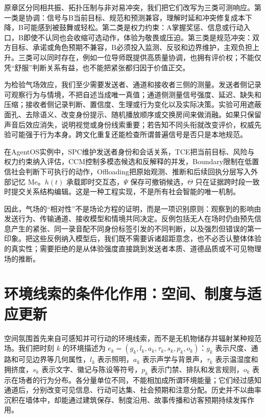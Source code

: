 原章区分同相共振、拓扑压制与非对易冲突，我们把它们改写为三类可测响应。第一类是协调：信号与B当前目标、规范和预测兼容，理解时延和冲突修复成本下降，B可能感到被鼓舞或轻松。第二类是权力约束：A掌握奖惩、信息或行动入口，B即使不认同也会收缩可选动作，体验为敬畏或压迫。第三类是规范冲突：双方目标、承诺或角色预期不兼容，B必须投入监测、反驳和边界维护，主观负担上升。三类可以同时存在，例如一位导师既提供高质量协调，也拥有评价权；不能仅凭“舒服”判断关系有益，也不能把紧张都归因于价值正交。

为检验气场效应，我们至少需要发送者、通道和接收者三侧的测量。发送者侧记录可观察行为与情境，不把自述当成唯一真值；通道侧测量信号强度、延迟、缺失和压缩；接收者侧记录判断、置信度、生理或行为变化以及实际决策。实验可用遮蔽面孔、去除语义、改变身份提示、随机播放顺序或交换房间来做消融。如果只保留声音后效应消失，说明视觉或身份线索重要；若告知不同头衔就改变评价，权威先验可能强于行为本身。跨文化重复还能检查所谓普遍信号是否只是本地规范。

在AgentOS实例中，SPC维护发送者身份和会话关系，TCE把当前目标、风险与权力约束纳入评估，CCM控制多模态候选和反解释的并发，Boundary限制在低置信社会判断下可执行的动作，Offloading把原始观测、推断和后续回执分层写入外部记忆 $\mathrm{Me}$。$h(t)$ 承载即时交互态，$\Psi$ 保存可撤销候选，$\Theta$ 只在证据跨时段一致时提交关系结构编辑。这是一种工程实现，不是所有社会智能的唯一机制。

因此，气场的“相对性”不是场论方程的证明，而是一项识别原则：观察到的影响由发送行为、传输通道、接收模型和情境共同决定。反例包括无人在场时仍由预先信息产生的紧张、同一录音配不同身份标签引发的不同判断，以及强烈但错误的第一印象。把这些反例纳入模型后，我们既不需要诉诸超距意念，也不必否认整体体验的真实性；需要拒绝的是从体验强度直接跳到发送者本质、道德品质或不可见物理场的推断。

\section{环境线索的条件化作用：空间、制度与适应更新}
\label{sec:environmental_manifold}
空间氛围首先来自可感知并可行动的环境线索，而不是无机物储存并辐射某种规范场。我们把时刻 $k$ 的环境描述为 $e_k=(g_k,l_k,a_k,\tau_k,s_k,p_k,o_k)$：$g_k$ 表示尺度、通路和可见边界等几何属性，$l_k$ 表示照明，$a_k$ 表示声学与背景声，$\tau_k$ 表示温湿度和拥挤度，$s_k$ 表示文字、徽记与陈设等符号，$p_k$ 表示门禁、排队和发言规则，$o_k$ 表示在场者的行为分布。各分量单位不同，不能相加成所谓环境能量；它们经过感知通道后，分别改变可见信息、行动可达集、社会预期和注意分配。历史并不以曲率沉积在墙体中，却能通过建筑保存、制度沿用、故事传播和访客预期持续发挥作用。

